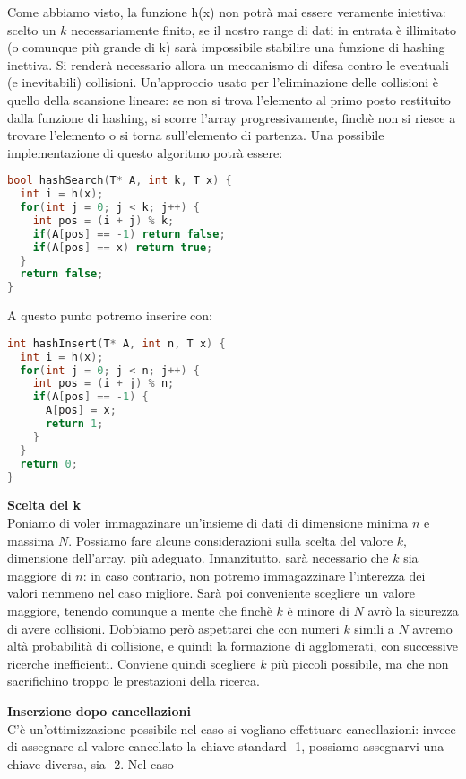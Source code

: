 \documentclass[a4paper,12pt]{article}
\begin{document}
Come abbiamo visto, la funzione h(x) non potrà mai essere veramente iniettiva: scelto un $k$ necessariamente finito, se il nostro range di dati in entrata è illimitato (o comunque
più grande di k) sarà impossibile stabilire una funzione di hashing inettiva. Si renderà necessario allora un meccanismo di difesa contro le eventuali (e inevitabili) collisioni.
Un'approccio usato per l'eliminazione delle collisioni è quello della scansione lineare: se non si trova l'elemento al primo posto restituito dalla funzione di hashing, si scorre
l'array progressivamente, finchè non si riesce a trovare l'elemento o si torna sull'elemento di partenza. Una possibile implementazione di questo algoritmo potrà essere:
\begin{lstlisting}[language=C++]
bool hashSearch(T* A, int k, T x) {
  int i = h(x);
  for(int j = 0; j < k; j++) {
    int pos = (i + j) % k;
    if(A[pos] == -1) return false;
    if(A[pos] == x) return true;
  }
  return false;
}
\end{lstlisting}
A questo punto potremo inserire con:
\begin{lstlisting}[language=C++]
int hashInsert(T* A, int n, T x) {
  int i = h(x);
  for(int j = 0; j < n; j++) {
    int pos = (i + j) % n;
    if(A[pos] == -1) {
      A[pos] = x;
      return 1;
    }
  }
  return 0;
}
\end{lstlisting}
\par\smallskip
\textbf{Scelta del k} \\
Poniamo di voler immagazinare un'insieme di dati di dimensione minima $n$ e massima $N$. Possiamo fare alcune considerazioni sulla scelta del valore
$k$, dimensione dell'array, più adeguato. Innanzitutto, sarà necessario che $k$ sia maggiore di $n$: in caso contrario, non potremo immagazzinare l'interezza dei valori
nemmeno nel caso migliore. Sarà poi conveniente scegliere un valore maggiore, tenendo comunque a mente che finchè $k$ è minore di $N$ avrò la sicurezza di avere collisioni. Dobbiamo
però aspettarci che con numeri $k$ simili a $N$ avremo altà probabilità di collisione, e quindi la formazione di agglomerati, con successive ricerche inefficienti. Conviene quindi
scegliere $k$ più piccoli possibile, ma che non sacrifichino troppo le prestazioni della ricerca.
\par\smallskip
\textbf{Inserzione dopo cancellazioni} \\
C'è un'ottimizzazione possibile nel caso si vogliano effettuare cancellazioni: invece di assegnare al valore cancellato la chiave standard -1, possiamo assegnarvi una chiave diversa, sia -2. Nel caso
\end{document}
